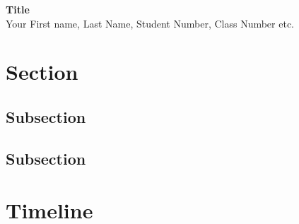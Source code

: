 \documentclass[10pt]{article}
\begin{document}
\begin{center}
	\Large\textbf{Title}\\[0.1in]
	\large Your First name, Last Name, Student Number, Class Number etc.
\end{center}

\section*{Section}
\subsection*{Subsection}
\subsection*{Subsection}

\section*{Timeline}
\end{document}
